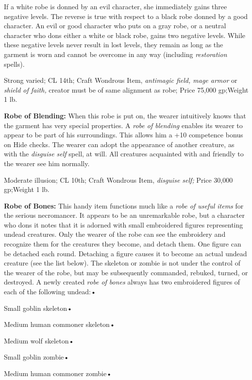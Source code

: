 \documentclass{article}
\begin{document}
\parindent=0pt
If a white robe is donned by an evil character, she immediately gains three negative 
levels. The reverse is true with respect to a black robe donned by a good character. 
An evil or good character who puts on a gray robe, or a neutral character who dons 
either a white or black robe, gains two negative levels. While these negative levels 
never result in lost levels, they remain as long as the garment is worn and cannot 
be overcome in any way (including \textit{restoration }spells).

Strong varied; CL 14th; Craft Wondrous Item, \textit{antimagic field, mage armor 
}or \textit{shield of faith, }creator must be of same alignment as robe; Price 
75,000 gp;Weight 1 lb.

\textbf{Robe of Blending:} When this robe is put on, the wearer intuitively knows 
that the garment has very special properties. A \textit{robe of blending }enables 
its wearer to appear to be part of his surroundings. This allows him a +10 competence 
bonus on Hide checks. The wearer can adopt the appearance of another creature, 
as with the \textit{disguise self }spell, at will. All creatures acquainted with 
and friendly to the wearer see him normally.

Moderate illusion; CL 10th; Craft Wondrous Item, \textit{disguise self; }Price 
30,000 gp;Weight 1 lb.

\textbf{Robe of Bones:} This handy item functions much like a \textit{robe of useful 
items }for the serious necromancer. It appears to be an unremarkable robe, but 
a character who dons it notes that it is adorned with small embroidered figures 
representing undead creatures. Only the wearer of the robe can see the embroidery 
and recognize them for the creatures they become, and detach them. One figure can 
be detached each round. Detaching a figure causes it to become an actual undead 
creature (see the list below). The skeleton or zombie is not under the control 
of the wearer of the robe, but may be subsequently commanded, rebuked, turned, 
or destroyed. A newly created \textit{robe of bones }always has two embroidered 
figures of each of the following undead:• 

\parindent=3pt
Small goblin skeleton• 

Medium human commoner skeleton• 

\parindent=7pt
Medium wolf skeleton• 

\parindent=3pt
Small goblin zombie• 

Medium human commoner zombie• 
\end{document}
